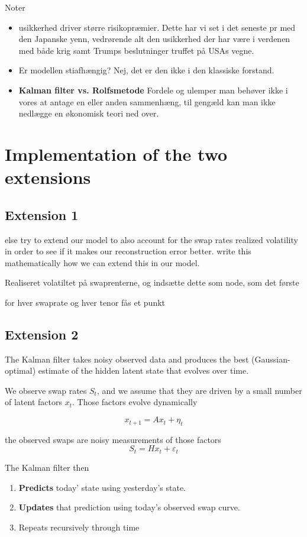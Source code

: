 Noter
\begin{itemize}
    \item usikkerhed driver større risikopræmier. Dette har vi set i det seneste pr med den Japanske yenn, vedrørende alt den usikkerhed der har være i verdenen med både krig samt Trumps beslutninger truffet på USAs vegne.
    \item Er modellen stiafhængig? Nej, det er den ikke i den klassiske forstand.
    \item \textbf{Kalman filter vs. Rolfsmetode} Fordele og ulemper man behøver ikke i vores at antage en eller anden sammenhæng, til gengæld kan man ikke nedlægge en økonomisk teori ned over.
\end{itemize}


\section{Implementation of the two extensions}


\subsection{Extension 1}


else try to extend our model to also account for the swap rates realized volatility in order to see if it makes our reconstruction error better. write this mathematically how we can extend this in our model.

Realiseret volatiltet på swaprenterne, og indsætte dette som node, som det første

for hver swaprate og hver tenor fås et punkt






\subsection{Extension 2}

The Kalman filter takes noisy observed data and produces the best (Gaussian-optimal) estimate of the hidden latent state that evolves over time.

We observe swap rates $S_t$, and we assume that they are driven by a small number of latent factors $x_t$. Those factors evolve dynamically

$$x_{t+1}=A x_t+\eta_t$$

the observed swaps are noisy measurements of those factors
$$S_t=Hx_t+\varepsilon_t$$

The Kalman filter then 
\begin{enumerate}
    \item \textbf{Predicts} today' state using yesterday's state.
    \item \textbf{Updates} that prediction using today's observed swap curve.
    \item Repeats recursively through time
\end{enumerate}

